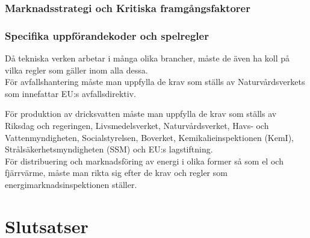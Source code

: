 \documentclass[10pt,a4paper]{article}
\begin{document}
\subsubsection{Marknadsstrategi och Kritiska framgångsfaktorer}

\subsubsection{Specifika uppförandekoder och spelregler}
Då tekniska verken arbetar i många olika brancher, måste de även ha koll på vilka regler som gäller inom alla dessa. \\

För avfallshantering måste man uppfylla de krav som ställs av Naturvårdsverkets som innefattar EU:s avfallsdirektiv. 

För produktion av dricksvatten måste man uppfylla de krav som ställs av Riksdag och regeringen, Livsmedelsverket, Naturvårdsverket, Havs- och Vattenmyndigheten, Socialstyrelsen, Boverket, Kemikalieinspektionen (KemI), Strålsäkerhetsmyndigheten (SSM) och EU:s lagstiftning.\\

För distribuering och marknadsföring av energi i olika former så som el och fjärrvärme, måste man rikta sig efter de krav och regler som energimarknadsinspektionen ställer.



\section{Slutsatser}
\end{document}
